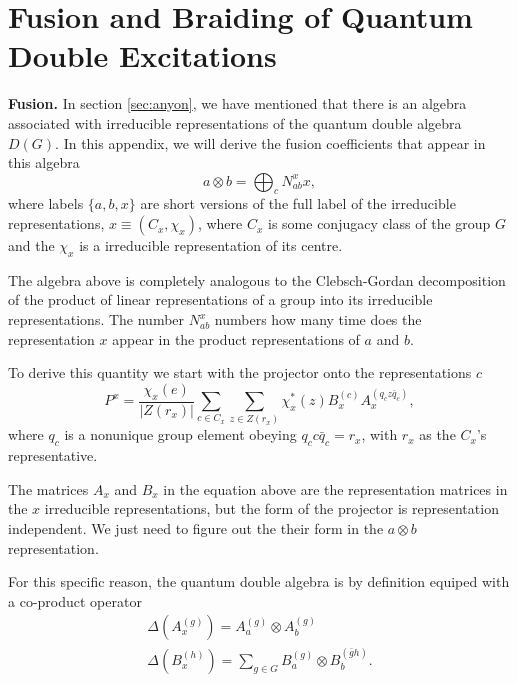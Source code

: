 \documentclass[two column]{article}
\begin{document}
\section{Fusion and Braiding of Quantum Double Excitations}\label{app:fusion}\label{app:braid}

\textbf{Fusion.} In section \ref{sec:anyon}, we have mentioned that there is an algebra associated with irreducible representations of the quantum double algebra $D(G)$. In this appendix, we will derive the fusion coefficients that appear in this algebra
\begin{equation}
	a \otimes b = \bigoplus_c N_{ab}^x x,
\end{equation}
where labels $\{a,b,x\}$ are short versions of the full label of the irreducible representations, $x \equiv (C_x, \chi_x)$, where $C_x$ is some conjugacy class of the group $G$ and the $\chi_x$ is a irreducible representation of its centre.

The algebra above is completely analogous to the Clebsch-Gordan decomposition of the product of linear representations of a group into its irreducible representations. The number $N_{ab}^x$ numbers how many time does the representation $x$ appear in the product representations of $a$ and $b$.

To derive this quantity we start with the projector onto the representations $c$
\begin{equation}
	P^x = \frac{\chi_x(e)}{|Z(r_x)|}\sum_{c \in C_x}\sum_{z \in Z(r_x)}\chi_x^*(z)B_x^{(c)}A_x^{(q_c z \bar{q}_c)},
\end{equation}
where $q_c$ is a nonunique group element obeying $q_c c \bar{q}_c = r_x$, with $r_x$ as the $C_x$'s representative.

The matrices $A_x$ and $B_x$ in the equation above are the representation matrices in the $x$ irreducible representations, but the form of the projector is representation independent. We just need to figure out the their form in the $a\otimes b$ representation.

For this specific reason, the quantum double algebra is by definition equiped with a co-product operator
\begin{equation}\begin{split}
	\Delta(A_x^{(g)}) = A_a^{(g)} \otimes A_b^{(g)}\\
	\Delta(B_x^{(h)}) = \sum_{g \in G} B_a^{(g)}\otimes B_b^{(\bar{g}h)}.
\end{split}\end{equation}
\end{document}
